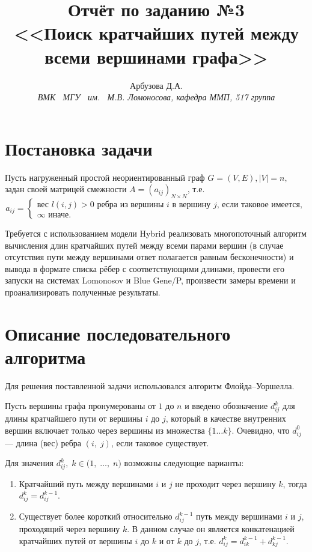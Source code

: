 \documentclass[a4paper,12pt]{report}
\begin{document}
\title{Отчёт по заданию №3 \\ <<Поиск кратчайших путей между всеми вершинами графа>>}
\author{Арбузова Д.А. \\ \textit{ВМК \, МГУ \, им. \, М.В. Ломоносова, кафедра ММП, 517 группа}}

\maketitle

\section*{Постановка задачи}
	\par Пусть нагруженный простой неориентированный граф $G=(V, E), |V| = n,$ задан своей матрицей смежности $A = (a_{ij})_{N \times N}$, т.е. 
	$$a_{ij} = \begin{cases}
		\text{вес $l(i,j) > 0$ ребра из вершины $i$ в вершину $j$, если таковое имеется},\\
		\infty \text{ иначе}.
		\end{cases}
$$
	\par Требуется с использованием модели Hybrid реализовать многопоточный алгоритм вычисления длин кратчайших путей между всеми парами вершин (в случае отсутствия пути между вершинами ответ полагается равным бесконечности) и вывода в формате списка рёбер с соответствующими длинами, провести его запуски на системах Lomonosov и Blue Gene/P, произвести замеры времени и проанализировать полученные результаты.
	
\section*{Описание последовательного алгоритма}
	\par Для решения поставленной задачи использовался алгоритм Флойда--Уоршелла.
	\par Пусть вершины графа пронумерованы от $1$ до $n$ и введено обозначение $d_{i j}^{k}$ для длины кратчайшего пути от вершины $i$ до $j$, который в качестве внутренних вершин включает только через вершины из множества $\{1 \ldots k\}$. Очевидно, что $d_{i j}^{0}$ — длина (вес) ребра $(i,\;j)$, если таковое существует.
	\par Для значения $d_{i j}^{k},\;k \in \mathbb (1,\;\ldots,\;n)$ возможны следующие варианты:
	\begin{enumerate}
	\item
	Кратчайший путь между вершинами $i$ и $j$ не проходит через вершину $k$, тогда $d_{i j}^{k}=d_{i j}^{k-1}$.
	\item
	Существует более короткий относительно $d_{ij}^{k-1}$ путь между вершинами $i$ и $j$, проходящий через вершину $k$. В данном случае он является конкатенацией кратчайших путей от вершины $i$ до $k$ и от $k$ до $j$, т.е. $d_{i j}^{k}=d_{i k}^{k-1} + d_{k j}^{k-1}.$
	\end{enumerate}
\end{document}
